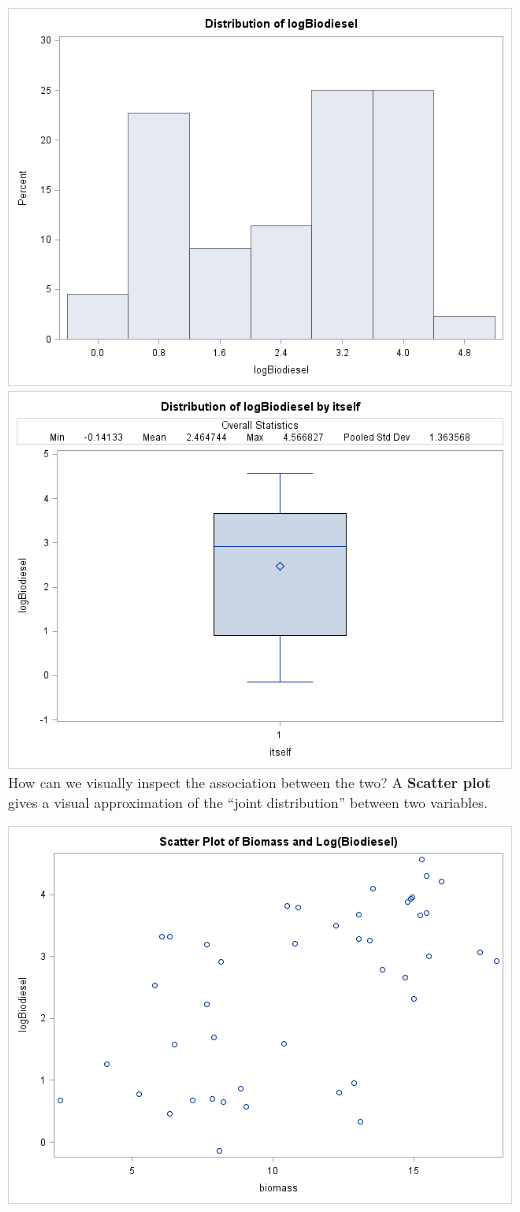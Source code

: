 \includegraphics[scale=0.35]{logbiodieselhist}\includegraphics[scale=0.35]{logbiodieselboxplot}\\

How can we visually inspect the association between the two? A \textbf{Scatter plot} gives a visual approximation of the ``joint distribution'' between two variables.
\begin{center}
\includegraphics[scale=0.5]{scatterbiomasslogbiodiesel}
\end{center}

